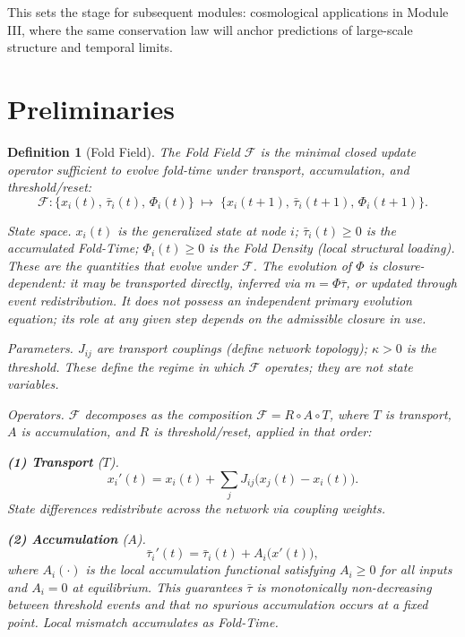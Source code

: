 \documentclass[11pt]{article}
\newtheorem{definition}[theorem]{Definition}
\begin{document}
This sets the stage for subsequent modules: cosmological applications in Module III, where the same conservation law will anchor predictions of large-scale structure and temporal limits.

\section{Preliminaries}

\begin{definition}[Fold Field]
The Fold Field $\mathcal{F}$ is the minimal closed update operator sufficient to evolve
fold-time under transport, accumulation, and threshold/reset:
\[
\mathcal{F}: \{x_i(t),\,\bar{\tau}_i(t),\,\Phi_i(t)\}
\;\mapsto\;
\{x_i(t+1),\,\bar{\tau}_i(t+1),\,\Phi_i(t+1)\}.
\]

\medskip
\noindent\textit{State space.}
$x_i(t)$ is the generalized state at node $i$; $\bar{\tau}_i(t) \geq 0$ is the
accumulated Fold-Time; $\Phi_i(t) \geq 0$ is the Fold Density (local structural loading).
These are the quantities that evolve under $\mathcal{F}$. The evolution of $\Phi$ is
closure-dependent: it may be transported directly, inferred via $m = \Phi\bar{\tau}$,
or updated through event redistribution. It does not possess an independent primary
evolution equation; its role at any given step depends on the admissible closure in use.

\medskip
\noindent\textit{Parameters.}
$J_{ij}$ are transport couplings (define network topology); $\kappa > 0$ is the threshold.
These define the regime in which $\mathcal{F}$ operates; they are not state variables.

\medskip
\noindent\textit{Operators.}
$\mathcal{F}$ decomposes as the composition $\mathcal{F} = R \circ A \circ T$,
where $T$ is transport, $A$ is accumulation, and $R$ is threshold/reset, applied in that order:

\medskip
\noindent\textbf{(1) Transport} ($T$).
\[
x_i'(t) = x_i(t) + \sum_j J_{ij}\bigl(x_j(t) - x_i(t)\bigr).
\]
State differences redistribute across the network via coupling weights.

\medskip
\noindent\textbf{(2) Accumulation} ($A$).
\[
\bar{\tau}_i'(t) = \bar{\tau}_i(t) + A_i\bigl(x'(t)\bigr),
\]
where $A_i(\cdot)$ is the local accumulation functional satisfying
$A_i \geq 0$ for all inputs and $A_i = 0$ at equilibrium.
This guarantees $\bar{\tau}$ is monotonically non-decreasing between threshold events
and that no spurious accumulation occurs at a fixed point.
Local mismatch accumulates as Fold-Time.


\end{definition}
\end{document}
